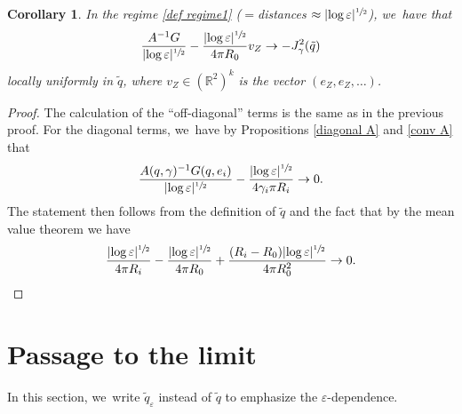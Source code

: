 \documentclass[10pt]{amsart}
\let\epsilon\varepsilon
\newtheorem{corollary}[theorem]{Corollary}
\theoremstyle{definition}
\newcommand\R{\mathbb{R}}
\let\eps\epsilon
\begin{document}
\begin{corollary}\label{conv J2}
In the regime \eqref{def regime1} ($={}$distances $\approx|{\log\eps}|^{\sfrac{1}{2}}$), we~have that
\begin{align*}
\frac{A^{-1}G}{|{\log\eps}|^{\sfrac{1}{2}}}-\frac{|{\log\eps}|^{\sfrac{1}{2}}}{4\pi R_0}v_Z\to -J_\gamma^2(\tilde{q})
\end{align*}
locally uniformly in $\tilde{q}$, where $v_Z\in (\R^2)^k$ is the vector $(e_Z,e_Z,\dots)$.
\end{corollary}
\begin{proof}
The calculation of the ``off-diagonal'' terms is the same as in the previous proof. For the diagonal terms, we~have by Propositions \ref{diagonal A} and \ref{conv A} that
\begin{align*}
\frac{A(q,\gamma)^{-1}G(q,e_i)}{|{\log\eps}|^{\sfrac{1}{2}}}-\frac{|{\log\eps}|^{\sfrac{1}{2}}}{4\gamma_i\pi R_i}\to 0.
\end{align*}
The statement then follows from the definition of $\tilde{q}$ and the fact that \eg by the mean value theorem we have
\[
\frac{|{\log\eps}|^{\sfrac{1}{2}}}{4\pi R_i}-\frac{|{\log\eps}|^{\sfrac{1}{2}}}{4\pi R_0}+\frac{(R_i-R_0)|{\log\eps}|^{\sfrac{1}{2}}}{4\pi R_0^2}\to 0.\qedhere
\]
\end{proof}

\section{Passage to the limit}\label{Section5}

In this section, we~write $\tilde{q}_\eps$ instead of $\tilde{q}$ to emphasize the $\eps$-dependence.
\end{document}
